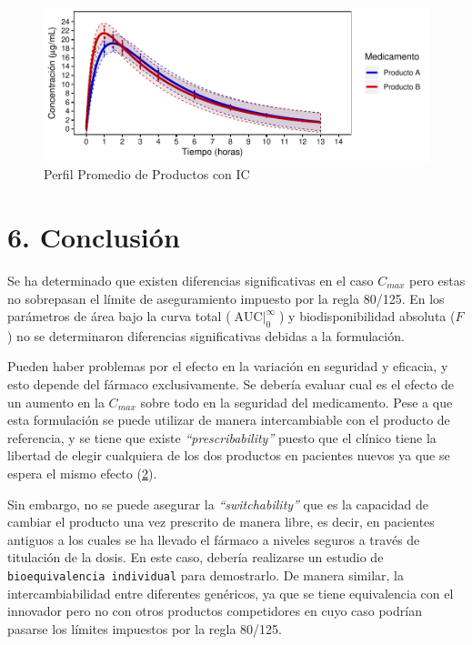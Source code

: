 \documentclass[]{article}
\begin{document}
\begin{figure}[H]

{\centering \includegraphics{parcial_1_files/figure-latex/unnamed-chunk-39-1} 

}

\caption{Perfil Promedio de Productos con IC}\label{fig:unnamed-chunk-39}
\end{figure}

\section{6. Conclusión}\label{conclusion}

Se ha determinado que existen diferencias significativas en el caso
\(C_{max}\) pero estas no sobrepasan el límite de aseguramiento impuesto
por la regla 80/125. En los parámetros de área bajo la curva total
(\(\textrm{AUC}\mid_{0}^{\infty}\)) y biodisponibilidad absoluta (\(F\))
no se determinaron diferencias significativas debidas a la formulación.

Pueden haber problemas por el efecto en la variación en seguridad y
eficacia, y esto depende del fármaco exclusivamente. Se debería evaluar
cual es el efecto de un aumento en la \(C_{max}\) sobre todo en la
seguridad del medicamento. Pese a que esta formulación se puede utilizar
de manera intercambiable con el producto de referencia, y se tiene que
existe \emph{``prescribability''} puesto que el clínico tiene la
libertad de elegir cualquiera de los dos productos en pacientes nuevos
ya que se espera el mismo efecto (\protect\hyperlink{ref-Chow2009}{2}).

Sin embargo, no se puede asegurar la \emph{``switchability''} que es la
capacidad de cambiar el producto una vez prescrito de manera libre, es
decir, en pacientes antiguos a los cuales se ha llevado el fármaco a
niveles seguros a través de titulación de la dosis. En este caso,
debería realizarse un estudio de \texttt{bioequivalencia\ individual}
para demostrarlo. De manera similar, la intercambiabilidad entre
diferentes genéricos, ya que se tiene equivalencia con el innovador pero
no con otros productos competidores en cuyo caso podrían pasarse los
límites impuestos por la regla 80/125.
\end{document}
